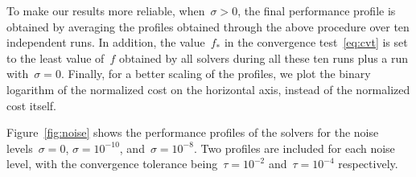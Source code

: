 \documentclass[
    smallextended,  %
    final,          %
]{svjour3}
\newcommand{\obj}{f}
\begin{document}
To make our results more reliable, when~$\sigma>0$, the final performance profile is obtained by
averaging the profiles obtained through the above procedure over ten independent runs. In addition, the
value~$\obj_{\ast}$ in the convergence test~\eqref{eq:cvt} is set to the least value of~$\obj$ obtained
by all solvers during all these ten runs plus a run with~$\sigma = 0$.
Finally, for a better scaling of the profiles, we plot the binary logarithm of the normalized cost
on the horizontal axis, instead of the normalized cost itself.

Figure~\ref{fig:noise} shows the performance profiles of the solvers for the noise levels~$\sigma = 0$, $\sigma = 10^{-10}$,  and~$\sigma = 10^{-8}$.
Two profiles are included for each noise level, with the convergence tolerance being~$\tau = 10^{-2}$ and~$\tau = 10^{-4}$ respectively.
\end{document}
